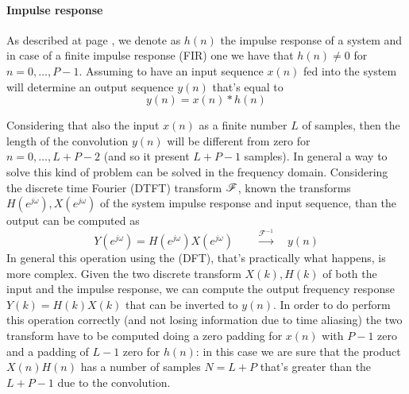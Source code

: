 	\paragraph{Impulse response} As described at page \pageref{sec:impulseresponse}, we denote as $h(n)$ the impulse response of a system and in case of a finite impulse response (FIR) one we have that $h(n) \neq 0$ for $n=0,\dots,P-1$. Assuming to have an input sequence $x(n)$ fed into the system will determine an output sequence $y(n)$ that's equal to
	\[ y(n) = x(n) * h(n) \] 
	
	Considering that also the input $x(n)$ as a finite number $L$ of samples, then the length of the convolution $y(n)$ will be different from zero for $n=0,\dots, L+P-2$ (and so it present $L+P-1$ samples). In general a way to solve this kind of problem can be solved in the frequency domain. Considering the discrete time Fourier (DTFT) transform $\mathscr F$, known the transforms $H(e^{j\omega}), X(e^{j\omega})$ of the system impulse response and input sequence, than the output can be computed as
	\[ Y(e^{j\omega}) = H(e^{j\omega}) X(e^{j\omega}) \qquad \xrightarrow{\mathscr{F}^{-1}} \quad y(n) \]
	In general this operation using the \dft (DFT), that's practically what happens, is more complex. Given the two discrete transform $X(k),H(k)$ of both the input and the impulse response, we can compute the output frequency response $Y(k) = H(k) X(k)$ that can be inverted to $y(n)$. In order to do perform this operation correctly (and not losing information due to time aliasing) the two transform have to be computed doing a zero padding for $x(n)$ with $P-1$ zero and a padding of $L-1$ zero for $h(n)$: in this case we are sure that the product $X(n)H(n)$ has a number of samples $N = L+P$ that's greater than the $L+P-1$ due to the convolution.
	
	
	
	
	
	
	
	
	
	
	
	
	
	
	
	
	
	
	
	
	
	
	
	
	
	
	
	
	
	
	
	
	
	
	
	
	
	
	
	
	
	
	
	
	
	
	
	
	
	
	
	
	
	
	
	
